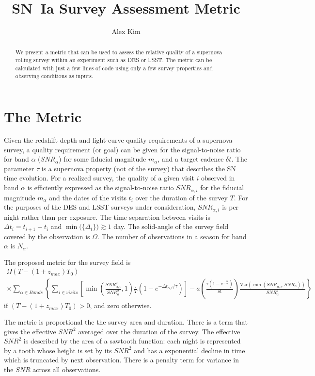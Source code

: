 \documentclass[preprint]{aastex}
\newcommand\SNR{\mathit{SNR}}
\newcommand{\Var}{\mathrm{Var}}
\begin{document}
\title{SN~Ia Survey Assessment Metric}
\author{Alex Kim}
\begin{abstract}
We present a metric that can be used to assess the relative quality of a supernova rolling survey within
an experiment such as DES or LSST.
The metric can be calculated with just a few lines of code using
only a few survey properties and observing conditions as inputs.
\end{abstract}

\section{The Metric}
Given the redshift depth and light-curve quality requirements of a supernova survey, a quality requirement (or goal) can be given
for the  signal-to-noise ratio for band $\alpha$ ($\SNR_\alpha$) for some fiducial magnitude $m_\alpha$, and a target cadence $\delta t$.
The parameter $\tau$ is a supernova property  (not of the survey) that describes the SN time evolution.
For a realized survey, the quality of a given visit $i$ observed in band $\alpha$ is efficiently expressed as the signal-to-noise ratio $\SNR_{\alpha, i}$
for the fiducial magnitude $m_\alpha$ and the dates of the visits $t_i$ over the duration of the survey $T$.  For the purposes
of the DES and LSST surveys under consideration, $\SNR_{\alpha, i}$ is per night rather than per exposure.
The time separation between visits is $\Delta t_i=t_{i+1}-t_i$ and $\min{(\{\Delta_t\}}) \gtrsim 1$ day.  The solid-angle of the survey field covered
by the observation is $\Omega$.  The number of observations in a season for band $\alpha$ is $N_\alpha$.


The proposed metric for the survey field is
\begin{multline}
	\Omega \left(T-(1+z_{max})T_0\right)   \\
	\times
	\sum_{\alpha \in Bands}	
		\left\{
			\sum_{i \in visits}		\left[ 		\min{\left(
				\frac{\SNR_{\alpha,i}^2}{\SNR_{\alpha}^{2} } ,1 \right)}
				\frac{\tau}{T}	\left(1-e^{-\Delta t_{\alpha,i}/\tau}\right)\right]
				-a\left(
		\frac{\tau(1-e^{-\frac{\delta t}{\tau}})}{\delta t}\right)		\frac{\Var\left(\min{\left(
				\SNR_{\alpha,i},{\SNR_{\alpha} }  \right)}
				\right)}{\SNR_\alpha^2}
				\right\}
\end{multline}
if $\left(T-(1+z_{max})T_0\right) > 0$, and zero otherwise.

The metric is proportional the the survey area and duration.  There is a term that gives the effective $\SNR^2$ averaged
over the duration of the survey.  The effective $\SNR^2$ is described by the area of a sawtooth function: each night is represented by a tooth
whose height is set by its $\SNR^2$ and has a exponential decline in time which is truncated by  next observation.  There is a penalty term
for variance in the $\SNR$ across all observations.
\end{document}
